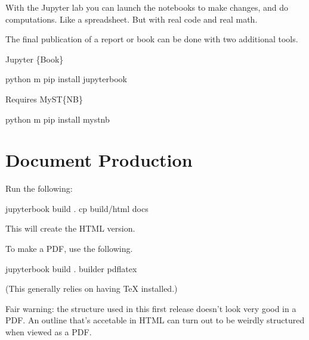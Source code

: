 \documentclass[letterpaper,10pt,english]{sphinxmanual}
\begin{document}
\sphinxAtStartPar
With the Jupyter lab you can launch the  notebooks to
make changes, and do computations. Like a spreadsheet. But
with real code and real math.

\sphinxAtStartPar
The final publication of a report or book can be done with two additional tools.

\sphinxAtStartPar
Jupyter \{Book\} 

\begin{sphinxVerbatim}[commandchars=\\\{\}]
python \PYGZhy{}m pip install jupyter\PYGZhy{}book
\end{sphinxVerbatim}

\sphinxAtStartPar
Requires MyST\{NB\} 

\begin{sphinxVerbatim}[commandchars=\\\{\}]
python \PYGZhy{}m pip install myst\PYGZhy{}nb
\end{sphinxVerbatim}


\chapter{Document Production}
\label{\detokenize{README:document-production}}
\sphinxAtStartPar
Run the following:

\begin{sphinxVerbatim}[commandchars=\\\{\}]
jupyter\PYGZhy{}book build .
cp \PYGZus{}build/html docs
\end{sphinxVerbatim}

\sphinxAtStartPar
This will create the HTML version.

\sphinxAtStartPar
To make a PDF, use the following.

\begin{sphinxVerbatim}[commandchars=\\\{\}]
jupyter\PYGZhy{}book build . \PYGZhy{}\PYGZhy{}builder pdflatex
\end{sphinxVerbatim}

\sphinxAtStartPar
(This generally relies on having TeX installed.)

\sphinxAtStartPar
Fair warning: the structure used in this first
release doesn’t look very good in a PDF. An
outline that’s accetable in HTML can turn out
to be weirdly structured when viewed as a PDF.
\end{document}
